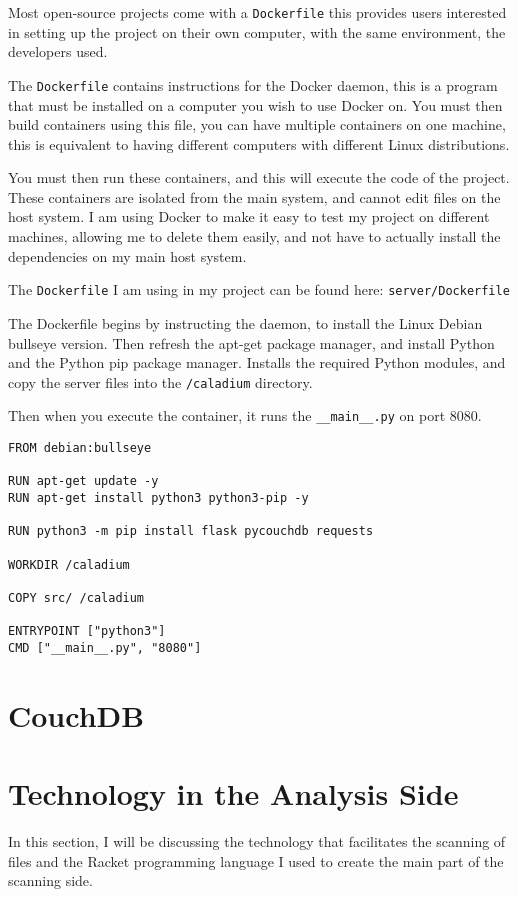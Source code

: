Most open-source projects come with a \texttt{Dockerfile} this provides
users interested in setting up the project on their own computer,
with the same environment, the developers used.

The \texttt{Dockerfile} contains instructions for the Docker daemon,
this is a program that must be installed on a computer you wish to use Docker on.
You must then build containers using this file,
you can have multiple containers on one machine,
this is equivalent to having different computers with different Linux distributions.

You must then run these containers, and this will execute the code of the project.
These containers are isolated from the main system, and cannot edit files on the host system.
I am using Docker to make it easy to test my project on different machines,
allowing me to delete them easily,
and not have to actually install the dependencies on my main host system.

The \texttt{Dockerfile} I am using in my project can be found here:
\texttt{server/Dockerfile}

The Dockerfile begins by instructing the daemon,
to install the Linux Debian bullseye version.
Then refresh the apt-get package manager,
and install Python and the Python pip package manager.
Installs the required Python modules,
and copy the server files into the \texttt{/caladium} directory.

Then when you execute the container,
it runs the \texttt{\_\_main\_\_.py} on port 8080.

\begin{lstlisting}
FROM debian:bullseye

RUN apt-get update -y
RUN apt-get install python3 python3-pip -y

RUN python3 -m pip install flask pycouchdb requests

WORKDIR /caladium

COPY src/ /caladium

ENTRYPOINT ["python3"]
CMD ["__main__.py", "8080"]
\end{lstlisting}

\section{CouchDB}

\section{Technology in the Analysis Side}
In this section, I will be discussing the technology that
facilitates the scanning of files and the Racket programming language
I used to create the main part of the scanning side.

